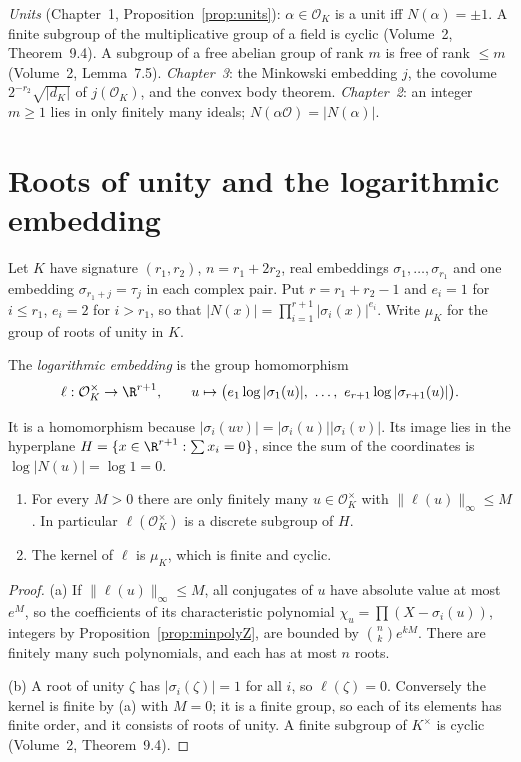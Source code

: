 \begin{reminder}
\emph{Units} (Chapter~1, Proposition~\ref{prop:units}): $\alpha\in\mathcal O_K$ is a unit iff $N(\alpha)=\pm1$. A finite
subgroup of the multiplicative group of a field is cyclic (Volume~2, Theorem~9.4). A subgroup of a free abelian group of
rank $m$ is free of rank $\le m$ (Volume~2, Lemma~7.5). \emph{Chapter~3}: the Minkowski embedding $j$, the covolume
$2^{-r_2}\sqrt{|d_K|}$ of $j(\mathcal O_K)$, and the convex body theorem. \emph{Chapter~2}: an integer $m\ge1$ lies in only
finitely many ideals; $N(\alpha\mathcal O)=|N(\alpha)|$.
\end{reminder}

\section{Roots of unity and the logarithmic embedding}

Let $K$ have signature $(r_1,r_2)$, $n=r_1+2r_2$, real embeddings $\sigma_1,\dots,\sigma_{r_1}$ and one embedding $\sigma_{r_1+j}=\tau_j$ in
each complex pair. Put $r=r_1+r_2-1$ and $e_i=1$ for $i\le r_1$, $e_i=2$ for $i>r_1$, so that $|N(x)|=\prod_{i=1}^{r+1}
|\sigma_i(x)|^{e_i}$. Write $\mu_K$ for the group of roots of unity in $K$.

\begin{definition}
The \emph{logarithmic embedding} is the group homomorphism
\[
\ell:\mathcal O_K^\times\to\R^{r+1},\qquad u\mapsto\bigl(e_1\log|\sigma_1(u)|,\ \dots,\ e_{r+1}\log|\sigma_{r+1}(u)|\bigr).
\]
\end{definition}

It is a homomorphism because $|\sigma_i(uv)|=|\sigma_i(u)||\sigma_i(v)|$. Its image lies in the hyperplane
$H=\{x\in\R^{r+1}:\sum x_i=0\}$, since the sum of the coordinates is $\log|N(u)|=\log1=0$.

\begin{proposition}\label{prop:logkernel}
\begin{enumerate}[label=(\alph*)]
\item For every $M>0$ there are only finitely many $u\in\mathcal O_K^\times$ with $\|\ell(u)\|_\infty\le M$. In particular
$\ell(\mathcal O_K^\times)$ is a discrete subgroup of $H$.
\item The kernel of $\ell$ is $\mu_K$, which is finite and cyclic.
\end{enumerate}
\end{proposition}
\begin{proof}
(a) If $\|\ell(u)\|_\infty\le M$, all conjugates of $u$ have absolute value at most $e^M$, so the coefficients of its
characteristic polynomial $\chi_u=\prod(X-\sigma_i(u))$, integers by Proposition~\ref{prop:minpolyZ}, are bounded by
$\binom nke^{kM}$. There are finitely many such polynomials, and each has at most $n$ roots.

(b) A root of unity $\zeta$ has $|\sigma_i(\zeta)|=1$ for all $i$, so $\ell(\zeta)=0$. Conversely the kernel is finite by
(a) with $M=0$; it is a finite group, so each of its elements has finite order, and it consists of roots of unity. A
finite subgroup of $K^\times$ is cyclic (Volume~2, Theorem~9.4).
\end{proof}

